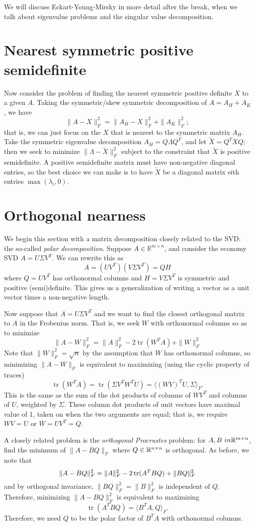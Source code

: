 \documentclass[12pt, leqno]{article} %
\begin{document}
We will discuss Eckart-Young-Mirsky in more detail after the break,
when we talk about eigenvalue problems and the singular value
decomposition.

\section{Nearest symmetric positive semidefinite}

Now consider the problem of finding the nearest symmetric positive
definite $X$ to a given $A$.  Taking the symmetric/skew symmetric
decomposition of $A = A_H + A_K$, we have
\[
  \|A-X\|_F^2 = \|A_H-X\|_F^2 + \|A_K\|_F^2;
\]
that is, we can just focus on the $X$ that is nearest to the
symmetric matrix $A_H$.  Take the symmetric eigenvalue decomposition
$A_H = Q \Lambda Q^T$, and let $\tilde{X} = Q^T X Q$; then we seek to
minimize $\|\Lambda - \tilde{X}\|_F^2$ subject to the constraint that
$\tilde{X}$ is positive semidefinite.  A positive semidefinite matrix
must have non-negative diagonal entries, so the best choice we can
make is to have $\tilde{X}$ be a diagonal matrix eith entries
$\max(\lambda_i, 0)$.

\section{Orthogonal nearness}

We begin this section with a matrix decomposition closely related to
the SVD: the so-called {\em polar decomposition}.  Suppose
$A \in \mathbb{R}^{m \times n}$, and consider the economy SVD
$A = U \Sigma V^T$.  We can rewrite this as
\[
  A = (U V^T) (V \Sigma V^T) = QH
\]
where $Q = UV^T$ has orthonormal columns and $H = V \Sigma V^T$ is
symmetric and positive (semi)definite.  This gives us a generalization
of writing a vector as a unit vector times a non-negative length.

Now suppose that $A = U \Sigma V^T$ and we want to find the closest
orthogonal matrix to $A$ in the Frobenius norm.  That is, we seek $W$
with orthonormal columns so as to minimize
\[
  \|A-W\|_F^2 = \|A\|_F^2 - 2 \operatorname{tr}(W^T A) + \|W\|_F^2
\]
Note that $\|W\|_F^2 = \sqrt{n}$ by the assumption that $W$ has
orthonormal columns, so minimizing $\|A-W\|_F$ is equivalent to
maximizing (using the cyclic property of traces)
\[
  \operatorname{tr}(W^T A)
  = \operatorname{tr}(\Sigma V^T W^T U)
  = \langle (W V)^T U, \Sigma \rangle_F.
\]
This is the same as the sum of the dot products of columns of $W V^T$
and columns of $U$, weighted by $\Sigma$.  These column dot products
of unit vectors have maximal value of 1, taken on when the two
arguments are equal; that is, we require $WV = U$ or $W = UV^T = Q$.

A closely related problem is the {\em orthogonal Procrustes} problem:
for $A, B \ in \mathbb{R}^{m \times n}$, find the minimum of $\|A-BQ\|_F$
where $Q \in \mathbb{R}^{n \times n}$ is orthogonal.  As before, we note
that
\[
  \|A-BQ\|_F^2 = \|A\|_F^2 - 2 \operatorname{tr}(A^T B Q) + \|B Q\|_F^2
\]
and by orthogonal invariance, $\|B Q\|_F^2 = \|B\|_F^2$ is independent
of $Q$.  Therefore, minimizing $\|A-BQ\|_F^2$ is equivalent to
maximizing
\[
  \operatorname{tr}(A^T B Q) = \langle B^T A, Q \rangle_F.
\]
Therefore, we need $Q$ to be the polar factor of $B^T A$ with
orthonormal columns.
\end{document}
